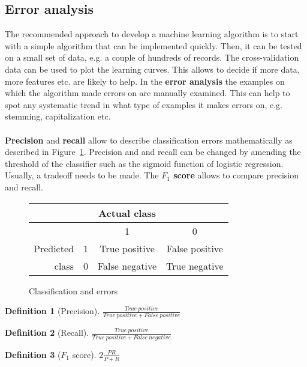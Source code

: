 \documentclass{report}
\newtheorem{definition}{Definition}[section]
\begin{document}
\subsection{Error analysis}
\label{chapter:erroranalysis}
The recommended approach to develop a machine learning algorithm is to start with a simple algorithm that can be implemented quickly.
Then, it can be tested on a small set of data, e.g. a couple of hundreds of records. The cross-validation data can be used to plot the learning curves.
This allows to decide if more data, more features etc. are likely to help. In the {\bf error analysis} the examples on which the algorithm made errors on are manually examined.
This can help to spot any systematic trend in what type of examples it makes errors on, e.g. stemming, capitalization etc.
\\ \\
{\bf Precision} and {\bf recall} allow to describe classification errors mathematically as described in Figure~\ref{ref:classificationerror}.
Precision and and recall can be changed by amending the threshold of the classifier such as the sigmoid function of logistic regression. Usually, a tradeoff needs to be made. The {\bf $F_1$ score} allows to compare precision and recall.

\begin{figure}[h!]
\centering
\begin{tabular}{r||ccc}
& & Actual class & \\
\hline
\hline
& & 1 & 0 \\
Predicted & 1 & True positive & False positive \\
class & 0 & False negative & True negative \\
\end{tabular}
\caption{Classification and errors}
\label{ref:classificationerror}
\end{figure}


\begin{definition}[Precision]
$\frac{True\:positive}{True\:positive + False\:positive}$
\end{definition}

\begin{definition}[Recall]
$\frac{True\:positive}{True\:positive + False\:negative}$
\end{definition}

\begin{definition}[$F_1$ score]
$2\frac{PR}{P+R}$
\end{definition}
\end{document}
